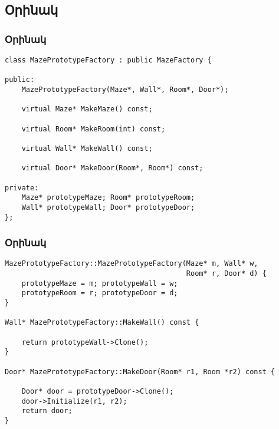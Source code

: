 \documentclass{beamer}
\begin{document}
\subsection{Օրինակ}
\begin{frame}[fragile]\frametitle{Օրինակ}
\begin{english}
\begin{verbatim}
class MazePrototypeFactory : public MazeFactory {

public:
    MazePrototypeFactory(Maze*, Wall*, Room*, Door*);

    virtual Maze* MakeMaze() const;

    virtual Room* MakeRoom(int) const;

    virtual Wall* MakeWall() const;

    virtual Door* MakeDoor(Room*, Room*) const;

private:
    Maze* prototypeMaze; Room* prototypeRoom;
    Wall* prototypeWall; Door* prototypeDoor;
};
\end{verbatim}
\end{english}
\end{frame}

\begin{frame}[fragile]\frametitle{Օրինակ}
\begin{english}
\begin{verbatim}
MazePrototypeFactory::MazePrototypeFactory(Maze* m, Wall* w,
                                           Room* r, Door* d) {
    prototypeMaze = m; prototypeWall = w;
    prototypeRoom = r; prototypeDoor = d;
}

Wall* MazePrototypeFactory::MakeWall() const {

    return prototypeWall->Clone();
}

Door* MazePrototypeFactory::MakeDoor(Room* r1, Room *r2) const {

    Door* door = prototypeDoor->Clone();
    door->Initialize(r1, r2);
    return door;
}
\end{verbatim}
\end{english}
\end{frame}
\end{document}
